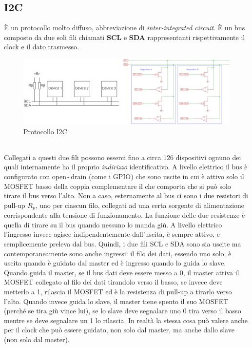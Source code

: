 \documentclass[12pt, a4paper]{report}
\begin{document}
\subsection{I2C}
È un protocollo molto diffuso, abbreviazione di \textit{inter-integrated circuit}. È un bus composto da due soli fili chiamati \textbf{SCL} e \textbf{SDA} rappresentanti rispettivamente il clock e il dato trasmesso.
\begin{figure}[h]
    \centering
    \includegraphics[scale=0.4,angle=0]{i2c.png}
    \caption{Protocollo I2C}
\end{figure}
\\Collegati a questi due fili possono esserci fino a circa 126 dispositivi ognuno dei quali internamente ha il proprio \textit{indirizzo} identificativo. A livello elettrico il bus è configurato con open\,-\,drain (come i GPIO) che sono uscite in cui è attivo solo il MOSFET basso della coppia complementare il che comporta che si può solo tirare il bus verso l'alto. Non a caso, esternamente al bus ci sono i due resistori di pull-up $R_{p}$, uno per ciascun filo, collegati ad una certa sorgente di alimentazione corrispondente alla tensione di funzionamento. La funzione delle due resistenze è quella di tirare su il bus quando nessuno lo manda giù. A livello elettrico l'ingresso invece agisce indipendentemente dall'uscita, è sempre attivo, e semplicemente preleva dal bus. Quindi, i due fili SCL e SDA sono sia uscite ma contemporaneamente sono anche ingressi: il filo dei dati, essendo uno solo, è uscita quando è guidato dal master ed è ingresso quando lo guida lo slave. Quando guida il master, se il bus dati deve essere messo a 0, il master  attiva il MOSFET collegato al filo dei dati tirandolo verso il basso, se invece deve metterlo a 1, rilascia il MOSFET ed è la resistenza di pull-up a tirarlo verso l'alto. Quando invece guida lo slave, il master tiene spento il suo MOSFET (perché se tira giù vince lui), se lo slave deve segnalare uno 0 tira verso il basso mentre se deve segnalare un 1 lo rilascia. In realtà la stessa cosa può valere anche per il clock che può essere guidato, non solo dal master, ma anche dallo slave (non solo dal master).
\end{document}
